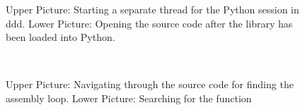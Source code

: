 \begin{code}
\begin{figure}[htbp]
  \caption{Upper Picture: Starting a separate thread for the Python session in ddd.
           Lower Picture: Opening the source code after the \dolfin library has been loaded into Python.}
  \label{figure12}
\end{figure}
\begin{figure}
   \\
\caption{Upper Picture: Navigating through the source code for finding the assembly loop.
         Lower Picture: Searching for the function  }
\label{figure34}
\end{figure}


\end{code}
